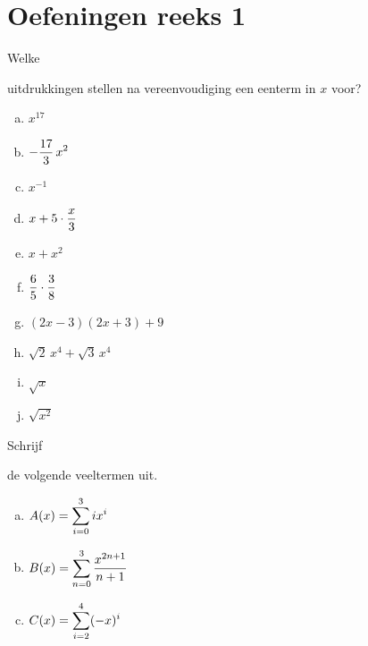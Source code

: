 \documentclass{ximera}
\begin{document}
\clearpage

{}
\section*{Oefeningen reeks 1}

\begin{Oefening}\setcounter{enumi}{1} 
\hypertarget{oef1.1}{Welke} uitdrukkingen stellen na vereenvoudiging een eenterm in $x$ voor? 
\begin{multicols}{2}
\begin{enumerate}[(a)]
\item
$x^{17}$
\item
$\displaystyle -\frac{17}{3}\,x^2$
\item
$x^{-1}$
\item
$\displaystyle x + 5\cdot \frac{x}{3}$
\item
$x + x^2$
\item
$\displaystyle \frac{6}{5}\cdot\frac{3}{8}$
\item
$(2x-3)(2x+3)+9$
\item
$\sqrt{2}\,x^4 + \sqrt{3}\,x^4$
\item
$\sqrt{x}$
\item
$\sqrt{x^2}$
\end{enumerate}
\end{multicols}
\end{Oefening}

\begin{Oefening}\setcounter{enumi}{2}
\hypertarget{oef1.2}{Schrijf} de volgende veeltermen uit.
\begin{enumerate}[(a)]
\item
$\displaystyle A(x) = \sum_{i=0}^3 ix^i$
\item
$\displaystyle B(x) = \sum_{n=0}^3 \frac{x^{2n+1}}{n+1}$
\item
$\displaystyle C(x) = \sum_{i=2}^4 (-x)^i$
\end{enumerate}
\end{Oefening}
\end{document}
